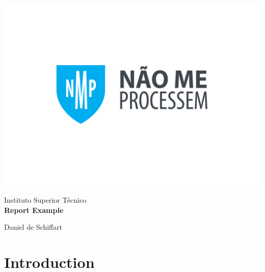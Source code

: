 \documentclass[palatino,english]{ist-report}
\begin{document}
\thispagestyle{empty}

\begin{center}
	\vspace{15mm}
	\includegraphics[width = 0.7\linewidth, trim = {171.76pt 202pt 171.76pt 202pt}, clip]{IST_A_CMYK_POS}
	
	{\large Instituto Superior Técnico}\\
	
	\vspace{5mm}
	{\huge\bfseries Report Example}
	
	\vspace{5mm}
	{\LARGE Daniel de Schiffart}
\end{center}

\pagebreak

{\hypersetup{linkcolor = black} \tableofcontents}

\pagebreak

\begin{abstract}
	The \LaTeX{} class developed in this project was developed as a template for reports developed for the Instituto Superior Técnico of Universidade de Lisboa, themed around the style the university has developed for its own internal documentation, complemented by using specifications defined by the university itself, all the while taking some creative liberties with the missing definitions.
	
	This document right here is meant as an example to show off most types of content to be typeset, and document the content of the class itself and its effect on the document.
\end{abstract}

\section{Introduction}
\end{document}
